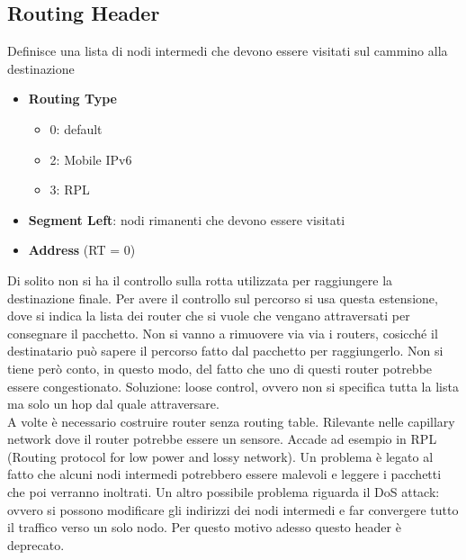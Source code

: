 \documentclass{article}
\begin{document}
\subsection{Routing Header}
Definisce una lista di nodi intermedi che devono essere visitati sul cammino alla destinazione
\begin{itemize}
    \item \textbf{Routing Type}
    \begin{itemize}
        \item 0: default
        \item 2: Mobile IPv6
        \item 3: RPL
    \end{itemize}
    \item \textbf{Segment Left}: nodi rimanenti che devono essere visitati
    \item \textbf{Address} (RT = 0)
\end{itemize}
Di solito non si ha il controllo sulla rotta utilizzata per raggiungere la destinazione finale. Per avere il controllo sul percorso si usa questa estensione, dove si indica la lista dei router che si vuole che vengano attraversati per consegnare il pacchetto. Non si vanno a rimuovere via via i routers, cosicché il destinatario può sapere il percorso fatto dal pacchetto per raggiungerlo. Non si tiene però conto, in questo modo, del fatto che uno di questi router potrebbe essere congestionato. Soluzione: loose control, ovvero non si specifica tutta la lista ma solo un hop dal quale attraversare. \\ A volte è necessario costruire router senza routing table. Rilevante nelle capillary network dove il router potrebbe essere un sensore. Accade ad esempio in RPL (Routing protocol for low power and lossy network). Un problema è legato al fatto che alcuni nodi intermedi potrebbero essere malevoli e leggere i pacchetti che poi verranno inoltrati. Un altro possibile problema riguarda il DoS attack: ovvero si possono modificare gli indirizzi dei nodi intermedi e far convergere tutto il traffico verso un solo nodo. Per questo motivo adesso questo header è deprecato.
\end{document}

